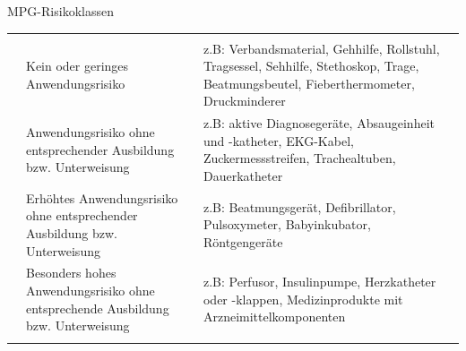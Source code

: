 \TableWide
{MPG-Risikoklassen}%
{}%
{}%
{}%
{}%
{%
\begin{tabulary}{\linewidth}{lLL}\toprule\addlinespace
\noindent{} &
\noindent{} &
\noindent{}
\\\addlinespace\midrule\addlinespace
{}
&
Kein oder geringes Anwendungsrisiko
&
z.B: Verbandsmaterial, Gehhilfe, Rollstuhl, Tragsessel, Sehhilfe, Stethoskop, 
Trage, Beatmungsbeutel, Fieberthermometer, Druckminderer 
\\\addlinespace
{}
&
Anwendungsrisiko ohne entsprechender Ausbildung bzw. Unterweisung
&
z.B: aktive Diagnosegeräte, Absaugeinheit und -katheter, EKG-Kabel, 
Zuckermessstreifen, Trachealtuben, Dauerkatheter 
\\\addlinespace
{}
&
Erhöhtes Anwendungsrisiko ohne entsprechender Ausbildung bzw. Unterweisung
&
z.B: Beatmungsgerät, Defibrillator, Pulsoxymeter, Babyinkubator, Röntgengeräte
\\\addlinespace
{}
&
Besonders hohes Anwendungsrisiko ohne entsprechende Ausbildung bzw. Unterweisung
&
z.B: Perfusor, Insulinpumpe, Herzkatheter oder -klappen, Medizinprodukte mit Arzneimittelkomponenten
\\\addlinespace\bottomrule
\end{tabulary}
}%
{}%

